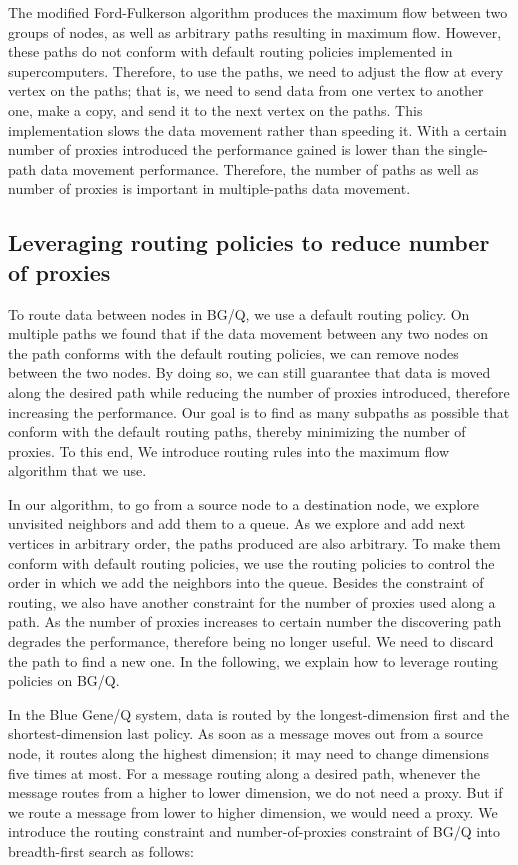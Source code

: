 \documentclass[final,5p,times]{elsarticle}
\begin{document}
The modified Ford-Fulkerson algorithm produces the maximum flow between two groups of nodes, as well as arbitrary paths resulting in maximum flow. However, these paths do not conform with default routing policies implemented in supercomputers. Therefore, to use the paths, we need to adjust the flow at every vertex on the paths; that is, we need to send data from one vertex to another one, make a copy, and send it to the next vertex on the paths. This implementation slows the data movement rather than speeding it. With a certain number of proxies introduced the performance gained is lower than the single-path data movement performance. Therefore, the number of paths as well as number of proxies is important in multiple-paths data movement.

\subsection{Leveraging routing policies to reduce number of proxies}
To route data between nodes in BG/Q, we use a default routing policy. On multiple paths we found that if the data movement between any two nodes on the path conforms with the default routing policies, we can remove nodes between the two nodes. By doing so, we can  still guarantee that data is moved along the desired path while reducing the number of proxies introduced, therefore increasing the performance. Our goal is to find as many subpaths as possible that conform with the default routing paths, thereby minimizing the number of proxies. To this end, We introduce routing rules into the maximum flow algorithm that we use.

In our algorithm, to go from a source node to a destination node, we explore unvisited neighbors and add them to a queue. As we explore and add next vertices in arbitrary order, the paths produced are also arbitrary. To make them conform with default routing policies, we use the routing policies to control the order in which we add the neighbors into the queue. Besides the constraint of routing, we also have another constraint for the number of proxies used along a path. As the number of proxies increases to certain number the discovering path degrades the performance, therefore being no longer useful. We need to discard the path to find a new one. In the following, we explain how to leverage routing policies on BG/Q.

In the Blue Gene/Q system, data is routed by the longest-dimension first and the shortest-dimension last policy. As soon as a message moves out from a source node, it routes along the highest dimension; it may need to change dimensions five times at most. For a message routing along a desired path, whenever the message routes from a higher to lower dimension, we do not need a proxy. But if we route a message from lower to higher dimension, we would need a proxy. We introduce the routing constraint and number-of-proxies constraint of BG/Q into breadth-first search as follows:
\end{document}
